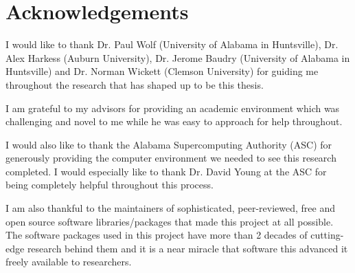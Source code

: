 \chapter{Acknowledgements}
\doublespacing
I would like to thank Dr. Paul Wolf (University of Alabama in Huntsville), Dr. Alex Harkess (Auburn University), Dr. Jerome Baudry (University of Alabama in Huntsville) and Dr. Norman Wickett (Clemson University) for guiding me throughout the research that has shaped up to be this thesis.

I am grateful to my advisors for providing an academic environment which was challenging and novel to me while he was easy to approach for help throughout.

I would also like to thank the Alabama Supercomputing Authority (ASC) for generously providing the computer environment we needed to see this research completed. I would especially like to thank Dr. David Young at the ASC for being completely helpful throughout this process.

I am also thankful to the maintainers of sophisticated, peer-reviewed, free and open source software libraries/packages that made this project at all possible. The software packages used in this project have more than 2 decades of cutting-edge research behind them and it is a near miracle that software this advanced it freely available to researchers.

